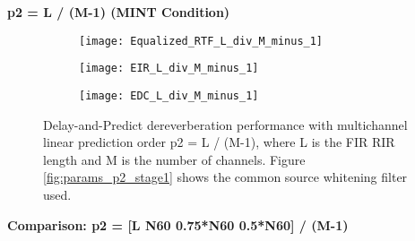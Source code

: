 \textbf{p2 = L / (M-1) (MINT Condition)}

\begin{figure}[H]
	\centering
	\begin{subfigure}[b]{0.32\textwidth}
		\centering
		\texttt{[image: Equalized\_RTF\_L\_div\_M\_minus\_1]}
	\end{subfigure}
	\hfill
	\begin{subfigure}[b]{0.32\textwidth}
		\centering
		\texttt{[image: EIR\_L\_div\_M\_minus\_1]}
	\end{subfigure}
	\hfill
	\begin{subfigure}[b]{0.32\textwidth}
		\centering
		\texttt{[image: EDC\_L\_div\_M\_minus\_1]}
	\end{subfigure}
	\hfill
	\caption{Delay-and-Predict dereverberation performance with multichannel linear prediction order p2 = L / (M-1), where L is the FIR RIR length and M is the number of channels. Figure \ref{fig:params_p2_stage1} shows the common source whitening filter used.}
	\label{fig:params_p2_L}
\end{figure}

\textbf{Comparison: p2 = [L  N60  0.75*N60  0.5*N60] / (M-1)}

